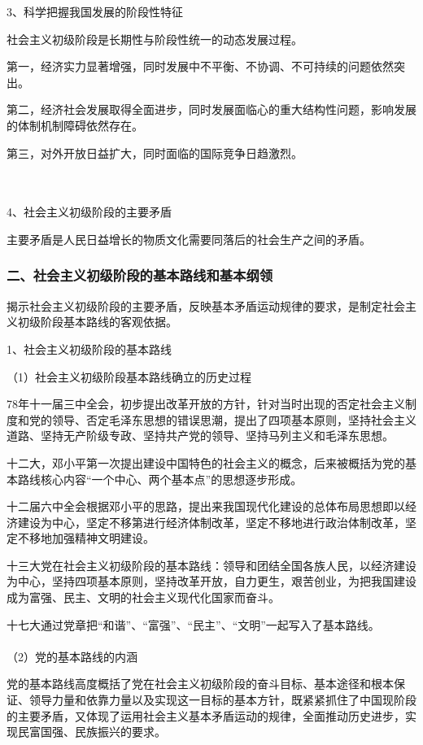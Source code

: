 \documentclass{ctexart}
\begin{document}
3、科学把握我国发展的阶段性特征

社会主义初级阶段是长期性与阶段性统一的动态发展过程。

第一，经济实力显著增强，同时发展中不平衡、不协调、不可持续的问题依然突出。

第二，经济社会发展取得全面进步，同时发展面临心的重大结构性问题，影响发展的体制机制障碍依然存在。

第三，对外开放日益扩大，同时面临的国际竞争日趋激烈。

\\\\

4、社会主义初级阶段的主要矛盾

主要矛盾是人民日益增长的物质文化需要同落后的社会生产之间的矛盾。



\subsubsection{二、社会主义初级阶段的基本路线和基本纲领}

揭示社会主义初级阶段的主要矛盾，反映基本矛盾运动规律的要求，是制定社会主义初级阶段基本路线的客观依据。

1、社会主义初级阶段的基本路线

（1）社会主义初级阶段基本路线确立的历史过程

78年十一届三中全会，初步提出改革开放的方针，针对当时出现的否定社会主义制度和党的领导、否定毛泽东思想的错误思潮，提出了四项基本原则，坚持社会主义道路、坚持无产阶级专政、坚持共产党的领导、坚持马列主义和毛泽东思想。

十二大，邓小平第一次提出建设中国特色的社会主义的概念，后来被概括为党的基本路线核心内容“一个中心、两个基本点”的思想逐步形成。

十二届六中全会根据邓小平的思路，提出来我国现代化建设的总体布局思想即以经济建设为中心，坚定不移第进行经济体制改革，坚定不移地进行政治体制改革，坚定不移地加强精神文明建设。

十三大党在社会主义初级阶段的基本路线：领导和团结全国各族人民，以经济建设为中心，坚持四项基本原则，坚持改革开放，自力更生，艰苦创业，为把我国建设成为富强、民主、文明的社会主义现代化国家而奋斗。

十七大通过党章把“和谐”、“富强”、“民主”、“文明”一起写入了基本路线。
\\\\

（2）党的基本路线的内涵

党的基本路线高度概括了党在社会主义初级阶段的奋斗目标、基本途径和根本保证、领导力量和依靠力量以及实现这一目标的基本方针，既紧紧抓住了中国现阶段的主要矛盾，又体现了运用社会主义基本矛盾运动的规律，全面推动历史进步，实现民富国强、民族振兴的要求。
\end{document}
